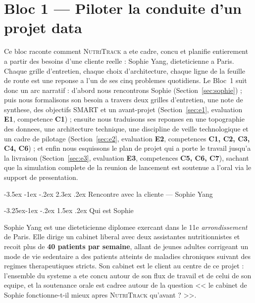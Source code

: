 \documentclass[a4paper,11pt,oneside,openany]{report}
\makeatletter
\renewcommand\section{\@startsection{section}{1}{\z@}%
  {-3.5ex \@plus -1ex \@minus -.2ex}%
  {2.3ex \@plus.2ex}%
  {\normalfont\Large\bfseries\color{ntgreen}}}
\renewcommand\subsection{\@startsection{subsection}{2}{\z@}%
  {-3.25ex\@plus -1ex \@minus -.2ex}%
  {1.5ex \@plus .2ex}%
  {\normalfont\large\bfseries\color{ntdarkgreen}}}
\newcommand{\competence}[1]{\textbf{\textcolor{ntgreen}{#1}}}
\newcommand{\evaluation}[1]{\textbf{\textcolor{ntblue}{#1}}}
\newcommand{\nutritrack}{\textsc{NutriTrack}}
\makeatother
\begin{document}
\chapter{Bloc 1 --- Piloter la conduite d'un projet data}
\label{ch:bloc1}

Ce bloc raconte comment \nutritrack{} a ete cadre, concu et planifie
entierement a partir des besoins d'une cliente reelle : Sophie Yang,
dieteticienne a Paris. Chaque grille d'entretien, chaque choix
d'architecture, chaque ligne de la feuille de route est une reponse
a l'un de ses cinq problemes quotidiens. Le Bloc~1 suit donc un arc
narratif : d'abord nous rencontrons Sophie (Section~\ref{sec:sophie}) ;
puis nous formalisons son besoin a travers deux grilles d'entretien,
une note de synthese, des objectifs SMART et un avant-projet
(Section~\ref{sec:e1}, evaluation \evaluation{E1},
competence \competence{C1}) ; ensuite nous traduisons ses reponses en
une topographie des donnees, une architecture technique, une discipline
de veille technologique et un cadre de pilotage
(Section~\ref{sec:e2}, evaluation \evaluation{E2},
competences \competence{C1, C2, C3, C4, C6}) ; et enfin nous esquissons
le plan de projet qui a porte le travail jusqu'a la livraison
(Section~\ref{sec:e3}, evaluation \evaluation{E3}, competences
\competence{C5, C6, C7}), sachant que la simulation complete de la
reunion de lancement est soutenue a l'oral via le support de
presentation.

\section{Rencontre avec la cliente --- Sophie Yang}
\label{sec:sophie}

\subsection{Qui est Sophie}

Sophie Yang est une dieteticienne diplomee exercant dans le 11e
\textit{arrondissement} de Paris. Elle dirige un cabinet liberal
avec deux assistantes nutritionnistes et recoit plus de
\textbf{40 patients par semaine}, allant de jeunes adultes corrigeant
un mode de vie sedentaire a des patients atteints de maladies
chroniques suivant des regimes therapeutiques stricts. Son cabinet
est le client au centre de ce projet : l'ensemble du systeme a ete
concu autour de son flux de travail et de celui de son equipe, et la
soutenance orale est cadree autour de la question
<< le cabinet de Sophie fonctionne-t-il mieux apres \nutritrack{}
qu'avant ? >>.
\end{document}

